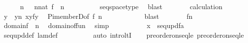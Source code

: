 \begin{isabellebody}
\ \ \ \ \isamarkupfalse%
\ n\ \ \ {\isachardoublequoteopen}n{\isasymin}nat{\isachardoublequoteclose}\ {\isachardoublequoteopen}f\ {\isacharcolon}{\kern0pt}\ n\ {\isasymrightarrow}\ {}{\isachardoublequoteclose}\isanewline
\ \ \ \ \ \ \isamarkupfalse%
\ seqspace{\isacharunderscore}{\kern0pt}type\ \isamarkupfalse%
\ blast\isanewline
\ \ \ \ \isamarkupfalse%
\ \isamarkupfalse%
\ calculation\isanewline
\ \ \ \ \isamarkupfalse%
\ y\ \ {\isachardoublequoteopen}y{\isasymin}n{\isachardoublequoteclose}\ {\isachardoublequoteopen}x{\isacharequal}{\kern0pt}{\isasymlangle}y{\isacharcomma}{\kern0pt}f{\isacharbackquote}{\kern0pt}y{\isasymrangle}{\isachardoublequoteclose}\ \isamarkupfalse%
\ Pi{\isacharunderscore}{\kern0pt}memberD{\isacharbrackleft}{\kern0pt}of\ f\ n\ {\isachardoublequoteopen}{\isasymlambda}{\isacharunderscore}{\kern0pt}\ {\isachardot}{\kern0pt}\ {}{\isachardoublequoteclose}{\isacharbrackright}{\kern0pt}\ \isanewline
\ \ \ \ \ \ \isamarkupfalse%
\ blast\isanewline
\ \ \ \ \isamarkupfalse%
\ \isamarkupfalse%
\ {\isacartoucheopen}f{\isacharcolon}{\kern0pt}n{\isasymrightarrow}{}{\isacartoucheclose}\isanewline
\ \ \ \ \isamarkupfalse%
\ {\isachardoublequoteopen}domain{\isacharparenleft}{\kern0pt}f{\isacharparenright}{\kern0pt}\ {\isacharequal}{\kern0pt}\ n{\isachardoublequoteclose}\ \isamarkupfalse%
\ domain{\isacharunderscore}{\kern0pt}of{\isacharunderscore}{\kern0pt}fun\ \isamarkupfalse%
\ simp\isanewline
\ \ \ \ \isamarkupfalse%
\isanewline
\ \ \ \ \isamarkupfalse%
\ {\isachardoublequoteopen}x\ {\isasymin}\ seq{\isacharunderscore}{\kern0pt}upd{\isacharparenleft}{\kern0pt}f{\isacharcomma}{\kern0pt}a{\isacharparenright}{\kern0pt}{\isachardoublequoteclose}\isanewline
\ \ \ \ \ \ \isamarkupfalse%
\ seq{\isacharunderscore}{\kern0pt}upd{\isacharunderscore}{\kern0pt}def\ lam{\isacharunderscore}{\kern0pt}def\ \ \isanewline
\ \ \ \ \ \ \isamarkupfalse%
\ {\isacharparenleft}{\kern0pt}auto\ intro{\isacharcolon}{\kern0pt}ltI{\isacharparenright}{\kern0pt}\isanewline
\ \ \isamarkupfalse%
\isanewline
{}\isamarkupfalse%
%
\endisatagproof
{\isafoldproof}%
%
\isadelimproof
\isanewline
%
\endisadelimproof
\isanewline
{}\isamarkupfalse%
\ preorder{\isacharunderscore}{\kern0pt}on{\isacharunderscore}{\kern0pt}seqle{\isacharcolon}{\kern0pt}\ {\isachardoublequoteopen}preorder{\isacharunderscore}{\kern0pt}on{\isacharparenleft}{\kern0pt}{}{\isacharcircum}{\kern0pt}{\isacharless}{\kern0pt}{\isasymomega}{\isacharcomma}{\kern0pt}seqle{\isacharparenright}{\kern0pt}{\isachardoublequoteclose}\isanewline

\end{isabellebody}
